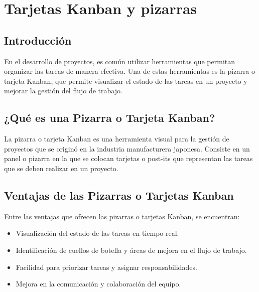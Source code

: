 \documentclass[../main]{subfiles}
\begin{document}
\chapter{Tarjetas Kanban y pizarras}


\section{Introducción}

En el desarrollo de proyectos, es común utilizar herramientas que permitan organizar las tareas de manera efectiva. Una de estas herramientas es la pizarra o tarjeta Kanban, que permite visualizar el estado de las tareas en un proyecto y mejorar la gestión del flujo de trabajo.

\section{¿Qué es una Pizarra o Tarjeta Kanban?}

La pizarra o tarjeta Kanban es una herramienta visual para la gestión de proyectos que se originó en la industria manufacturera japonesa. Consiste en un panel o pizarra en la que se colocan tarjetas o post-its que representan las tareas que se deben realizar en un proyecto.

\section{Ventajas de las Pizarras o Tarjetas Kanban}

Entre las ventajas que ofrecen las pizarras o tarjetas Kanban, se encuentran:

\begin{itemize}
    \item Visualización del estado de las tareas en tiempo real.
    \item Identificación de cuellos de botella y áreas de mejora en el flujo de trabajo.
    \item Facilidad para priorizar tareas y asignar responsabilidades.
    \item Mejora en la comunicación y colaboración del equipo.
\end{itemize}
\end{document}
